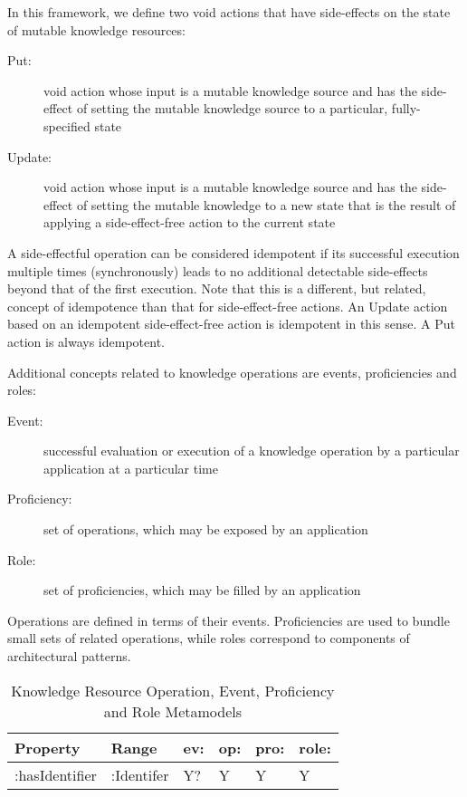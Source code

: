 \documentclass[runningheads]{llncs}
\begin{document}
In this framework, we define two void actions that have side-effects on the state of mutable knowledge resources:
  \begin{description}
    \item[Put:] void action whose input is a mutable knowledge source and has the side-effect of setting the mutable knowledge source to a particular, fully-specified state
    \item[Update:] void action whose input is a mutable knowledge source and has the side-effect of setting the mutable knowledge to a new state that is the result of applying a side-effect-free action to the current state
  \end{description}
  
  A side-effectful operation can be considered idempotent if its successful execution multiple times (synchronously) leads to no additional detectable side-effects beyond that of the first execution. Note that this is a different, but related, concept of idempotence than that for side-effect-free actions. An Update action based on an idempotent side-effect-free action is idempotent in this sense. A Put action is always idempotent.

Additional concepts related to knowledge operations are events, proficiencies and roles:
\begin{description}
  \item[Event:] successful evaluation or execution of a knowledge operation by a particular application at a particular time
  \item[Proficiency:] set of operations, which may be exposed by an application
  \item[Role:] set of proficiencies, which may be filled by an application
\end{description}

Operations are defined in terms of their events. Proficiencies are used to bundle small sets of related operations, while roles correspond to components of architectural patterns.


\begin{table}[h]
\centering
\begin{tabular}{|l|l|l|l|l|l|}
 \hline
\textbf{Property} & \textbf{Range} & \textbf{ev:} & \textbf{op:}  & \textbf{pro:} & \textbf{role:} \\ \hline
:hasIdentifier    & :Identifer     & Y?           & Y             & Y             & Y              \\ \hline
\end{tabular}
\caption{Knowledge Resource Operation, Event, Proficiency and Role Metamodels}
\label{kroponto}
\end{table}
\end{document}
